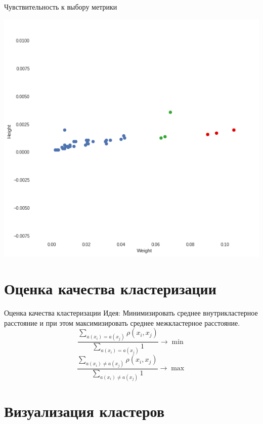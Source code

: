 \documentclass[10pt]{beamer}
\begin{document}
\begin{frame}{Чувствительность к выбору метрики}
	\begin{center}
	  \includegraphics[height=0.8 \textheight, keepaspectratio = true]{images/weight_height4}  
	\end{center}
\end{frame}

\section{Оценка качества кластеризации}

\begin{frame}{Оценка качества кластеризации}
  \alert{Идея}: Минимизировать среднее внутрикластерное расстояние и при этом максимизировать среднее межкластерное расстояние.
	\bigbreak
	\pause
	$${\frac{\sum\limits_{a(x_i) = a(x_j)} \rho(x_i, x_j)}{\sum\limits_{a(x_i) = a(x_j)} 1} \rightarrow \min}$$
	\bigbreak
	\pause
	$${\frac{\sum\limits_{a(x_i) \neq a(x_j)} \rho(x_i, x_j)}{\sum\limits_{a(x_i) \neq a(x_j)} 1} \rightarrow \max}$$
\end{frame}

\section{Визуализация кластеров}
\end{document}
